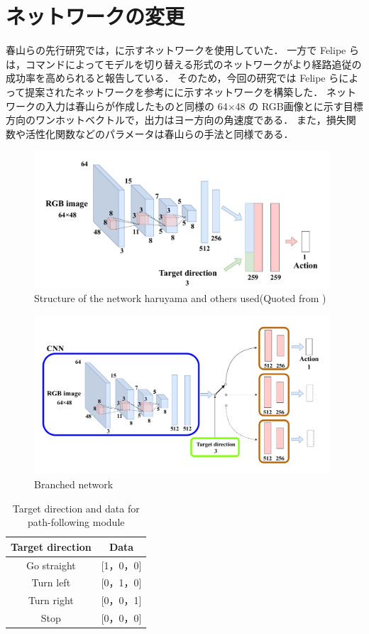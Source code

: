 \section{ネットワークの変更}
春山らの先行研究では，に示すネットワークを使用していた．
一方で Felipe らは，コマンドによってモデルを切り替える形式のネットワークがより経路追従の成功率を高められると報告している．
そのため，今回の研究では Felipe らによって提案されたネットワークを参考にに示すネットワークを構築した．
ネットワークの入力は春山らが作成したものと同様の 64×48 の RGB画像とに示す目標方向のワンホットベクトルで，出力はヨー方向の角速度である．
また，損失関数や活性化関数などのパラメータは春山らの手法と同様である．

\begin{figure}[htbp]
  \centering
  \includegraphics[width=110mm]{images/pdf/haruyama/net.pdf}
  \caption[Structure of the network haruyama and others used]{Structure of the network haruyama and others used(Quoted from \cite{fujiwara2023})}
  \label{fig:haruyama_net}
\end{figure}

\begin{figure}[htbp]
  \centering
   \includegraphics[width=110mm]{images/pdf/ishiguro/branched.pdf}
   \caption{Branched network}
   \label{fig:branched}
\end{figure}

\begin{table}[htbp]
  \centering
  \caption{Target direction and data for path-following module}\label{tab:cmd_dir}
  \begin{tabular}{|c|c|}
  \hline
  Target direction & Data        \\
  \hline
  Go straight   & {[}1，0，0{]} \\
  Turn left   & {[}0，1，0{]} \\
  Turn right   & {[}0，0，1{]} \\
  Stop   & {[}0，0，0{]}\\
  \hline
  \end{tabular}
\end{table}

\clearpage
